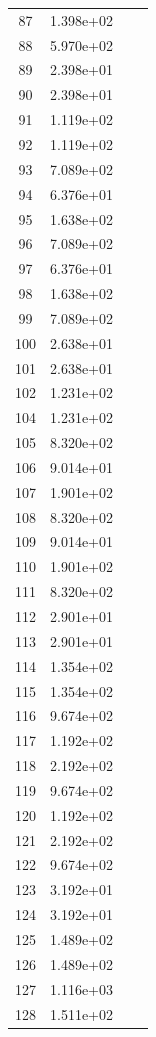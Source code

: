 \documentclass[12pt]{article}
\begin{document}
\begin{longtable}{@{}cccc@{}}
87 & 1.398e+02 &  &  \\
88 & 5.970e+02 &  &  \\
89 & 2.398e+01 &  &  \\
90 & 2.398e+01 &  &  \\
91 & 1.119e+02 &  &  \\
92 & 1.119e+02 &  &  \\
93 & 7.089e+02 &  &  \\
94 & 6.376e+01 &  &  \\
95 & 1.638e+02 &  &  \\
96 & 7.089e+02 &  &  \\
97 & 6.376e+01 &  &  \\
98 & 1.638e+02 &  &  \\
99 & 7.089e+02 &  &  \\
100 & 2.638e+01 &  &  \\
101 & 2.638e+01 &  &  \\
102 & 1.231e+02 &  &  \\
104 & 1.231e+02 &  &  \\
105 & 8.320e+02 &  &  \\
106 & 9.014e+01 &  &  \\
107 & 1.901e+02 &  &  \\
108 & 8.320e+02 &  &  \\
109 & 9.014e+01 &  &  \\
110 & 1.901e+02 &  &  \\
111 & 8.320e+02 &  &  \\
112 & 2.901e+01 &  &  \\
113 & 2.901e+01 &  &  \\
114 & 1.354e+02 &  &  \\
115 & 1.354e+02 &  &  \\
116 & 9.674e+02 &  &  \\
117 & 1.192e+02 &  &  \\
118 & 2.192e+02 &  &  \\
119 & 9.674e+02 &  &  \\
120 & 1.192e+02 &  &  \\
121 & 2.192e+02 &  &  \\
122 & 9.674e+02 &  &  \\
123 & 3.192e+01 &  &  \\
124 & 3.192e+01 &  &  \\
125 & 1.489e+02 &  &  \\
126 & 1.489e+02 &  &  \\
127 & 1.116e+03 &  &  \\
128 & 1.511e+02 &  &  \\

\end{longtable}
\end{document}
